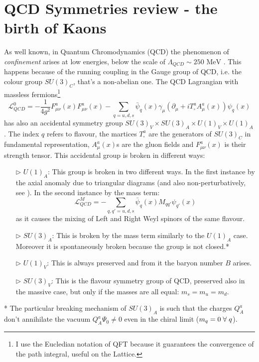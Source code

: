 \documentclass[english, LaM, oneside, noexaminfo]{sapthesis}
\newcommand{\mev}{\text{ MeV}}
\newcommand{\spc}{\hspace*{1mm}}
\begin{document}
\section{QCD Symmetries review - the birth of Kaons}
\noindent
As well known, in Quantum Chromodynamics (QCD) the phenomenon of \textit{confinement} arises at low energies, below the scale of $\Lambda_{QCD} \sim 250 \mev$ \cite{WeinbergII}.
This happens because of the running coupling in the Gauge group of QCD, i.e. the colour group $SU(3)_C$, that's a non-abelian one.
The QCD Lagrangian with massless fermions\footnote{I use the Eucledian notation of QFT because it guarantees the convergence of the path integral, useful on the Lattice.}
\begin{equation}\label{eq:masslessQCD}
    \mathcal{L}_{QCD}^0 = -\frac{1}{4g^2} F_{\mu\nu}^a(x)F_{\mu\nu}^a(x) - \sum_{q = u,d,s} \bar\psi_q (x) \gamma_\mu \left( \partial_\mu + i T^a_{\square} A_\mu^a (x) \right) \psi_q (x)
\end{equation}
has also an accidental symmetry group $SU(3)_V \times SU(3)_A \times U(1)_V \times U(1)_A$.
The index $q$ refers to flavour, the martices $T^a_{\square}$ are the generators of $SU(3)_C$ in fundamental representation, $A_\mu^a (x) $s are the gluon fields and $F_{\mu\nu}^a(x)$ is their strength tensor.
This accidental group is broken in different ways:
\begin{itemize}
    \item [$\triangleright$] $U(1)_A$: This group is broken in two different ways. In the first instance by the axial anomaly due to triangular diagrams (and also non-perturbatively, see \cite{FujikawaI}\cite{FujikawaII}).
            In the second instance by the mass term: $$\mathcal{L}_{QCD}^M = - \sum_{q,q' = u,d,s} \bar\psi_q (x) M_{qq'} \psi_{q'} (x)$$ as it causes the mixing of Left and Right Weyl spinors of the same flavour.
    \item [$\triangleright$] $SU(3)_A$: This is broken by the mass term similarly to the $U(1)_A$ case.
            Moreover it is spontaneously broken because the group is not closed.*
    \item [$\triangleright$] $U(1)_V$: This is always preserved and from it the baryon number $B$ arises.
    \item [$\triangleright$] $SU(3)_V$: This is the flavour symmetry group of QCD, preserved also in the massive case, but only if the masses are all equal: $m_s = m_u = m_d$.
\end{itemize}
* The particular breaking mechanism of $SU(3)_A$ is such that the charges $Q^a_A$ don't annihilate the vacuum $Q^a_A \Psi_0 \ne 0$ even in the chiral limit ($m_q = 0 \spc \forall \spc q$).
\end{document}
